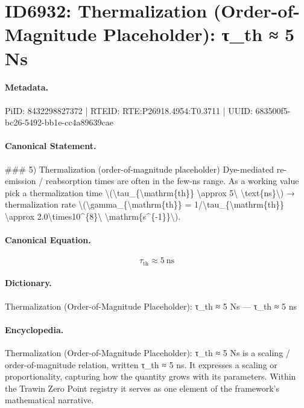 \section*{ID6932: Thermalization (Order-of-Magnitude Placeholder): τ\_th ≈ 5 Ns}
\paragraph{Metadata.}
PiID: 8432298827372 | RTEID: RTE:P26918.4954:T0.3711 | UUID: 683500f5-bc26-5492-bb1e-cc4a89639cae

\paragraph{Canonical Statement.}
\#\#\# 5) Thermalization (order-of-magnitude placeholder) Dye-mediated re-emission / reabsorption times are often in the few-ns range. As a working value pick a thermalization time \textbackslash{}(\textbackslash{}tau\_\{\textbackslash{}mathrm\{th\}\} \textbackslash{}approx 5\textbackslash{} \textbackslash{}text\{ns\}\textbackslash{}) → thermalization rate \textbackslash{}(\textbackslash{}gamma\_\{\textbackslash{}mathrm\{th\}\} = 1/\textbackslash{}tau\_\{\textbackslash{}mathrm\{th\}\} \textbackslash{}approx 2.0\textbackslash{}times10\textasciicircum{}\{8\}\textbackslash{} \textbackslash{}mathrm\{s\textasciicircum{}\{-1\}\}\textbackslash{}).

\paragraph{Canonical Equation.}
\[
\tau_{\mathrm{th}} \approx 5\ \text{ns}
\]

\paragraph{Dictionary.}
Thermalization (Order-of-Magnitude Placeholder): τ\_th ≈ 5 Ns — τ\_th ≈ 5 ns

\paragraph{Encyclopedia.}
Thermalization (Order-of-Magnitude Placeholder): τ\_th ≈ 5 Ns is a scaling / order-of-magnitude relation, written τ\_th ≈ 5 ns. It expresses a scaling or proportionality, capturing how the quantity grows with its parameters. Within the Trawin Zero Point registry it serves as one element of the framework's mathematical narrative.
